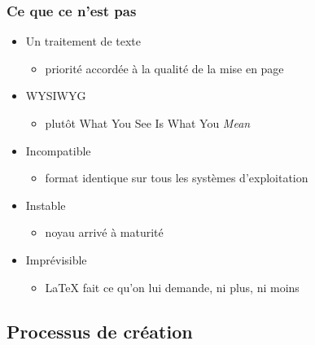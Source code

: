 \documentclass[aspectratio=54,10pt,xcolor=x11names]{beamer}
\theoremstyle{example}
\begin{document}
\begin{frame}
  \frametitle{Ce que ce n'est pas}
  \begin{itemize}
  \item Un traitement de texte
    \begin{itemize}
    \item priorité accordée à la qualité de la mise en page
    \end{itemize}
  \item WYSIWYG
    \begin{itemize}
    \item plutôt What You See Is What You \emph{Mean}
    \end{itemize}
  \item Incompatible
    \begin{itemize}
    \item format identique sur tous les systèmes d'exploitation
    \end{itemize}
  \item Instable
    \begin{itemize}
    \item noyau arrivé à maturité
    \end{itemize}
  \item Imprévisible
    \begin{itemize}
    \item {\LaTeX} fait ce qu'on lui demande, ni plus, ni moins
    \end{itemize}
  \end{itemize}
\end{frame}

\subsection{Processus de création}
\end{document}
